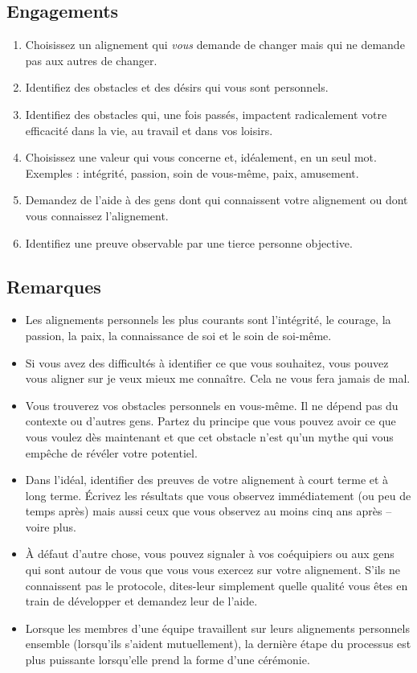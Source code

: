 \documentclass[11pt]{book}
\begin{document}
\subsection{Engagements}
\begin{enumerate}
	\item Choisissez un alignement qui \emph{vous} demande de changer mais qui ne demande pas aux autres de changer.
	\item Identifiez des obstacles et des désirs qui vous sont personnels.
	\item Identifiez des obstacles qui, une fois passés, impactent radicalement votre efficacité dans la vie, au travail et dans vos loisirs.
	\item Choisissez une valeur qui vous concerne et, idéalement, en un seul mot. Exemples : intégrité, passion, soin de vous-même, paix, amusement.
	\item Demandez de l'aide à des gens dont qui connaissent votre alignement ou dont vous connaissez l'alignement.
	\item Identifiez une preuve observable par une tierce personne objective.
\end{enumerate}

\subsection{Remarques}
\begin{itemize}
	\item Les alignements personnels les plus courants sont l'intégrité, le courage, la passion, la paix, la connaissance de soi et le soin de soi-même.
	\item Si vous avez des difficultés à identifier ce que vous souhaitez, vous pouvez vous aligner sur \og{}je veux mieux me connaître\fg{}. Cela ne vous
	      fera jamais de mal.
	\item Vous trouverez vos obstacles personnels en vous-même. Il ne dépend pas du contexte ou d'autres gens. Partez du principe que vous pouvez avoir ce
	      que vous voulez dès maintenant et que cet obstacle n'est qu'un mythe qui vous empêche de révéler votre potentiel.
	\item Dans l'idéal, identifier des preuves de votre alignement à court terme et à long terme. Écrivez les résultats que vous observez immédiatement (ou
	      peu de temps après) mais aussi ceux que vous observez au moins cinq ans après -- voire plus.
	\item À défaut d'autre chose, vous pouvez signaler à vos coéquipiers ou aux gens qui sont autour de vous que vous vous exercez sur votre alignement.
	      S'ils ne connaissent pas le protocole, dites-leur simplement quelle qualité vous êtes en train de développer et demandez leur de l'aide.
	\item Lorsque les membres d'une équipe travaillent sur leurs alignements personnels ensemble (lorsqu'ils s'aident mutuellement), la dernière étape du
	      processus est plus puissante lorsqu'elle prend la forme d'une cérémonie.
\end{itemize}
\end{document}
